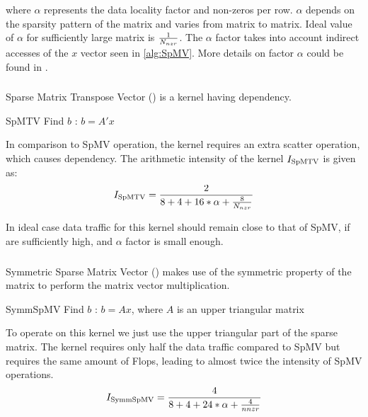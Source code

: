where $\alpha$ represents the data locality factor and \NNZR non-zeros per row. $\alpha$ depends on the sparsity pattern of the matrix and varies from matrix to matrix. Ideal value of $\alpha$ for sufficiently large matrix is $\frac{1}{N_{nzr}}$. The $\alpha$ factor takes into account indirect accesses of the $x$ vector seen in \cref{alg:SpMV}. More details on factor $\alpha$ could be found in \cite{Moritz_sell}.

\subsubsection{\SpMTV}
Sparse Matrix Transpose Vector (\SpMTV) is a kernel having \DTWO dependency.
\begin{algorithm}[H]
	\caption{SpMTV Find $b$ : $b=A'x$} 
	\label{alg:SpMTV}
	\begin{algorithmic}[1]
		\ENDFOR
		\ENDFOR
	\end{algorithmic}
\end{algorithm}
In comparison to SpMV operation, the kernel requires an extra scatter operation, which causes dependency. The arithmetic intensity of the kernel $I_\mathrm{SpMTV}$ is given as:
\begin{equation}
\label{eq:SpMTV_intensity}
I_\mathrm{\SpMTV} = \frac{2}{8+4+16*\alpha+\frac{8}{\NNZRmath}} \\
\end{equation}

In ideal case data traffic for this kernel should remain close to that of SpMV, if \NNZR are sufficiently high, and $\alpha$ factor is small enough.

\subsubsection{\SymmSpmv}
Symmetric Sparse Matrix Vector (\SymmSpmv) makes use of the symmetric property of the matrix to perform the matrix  vector multiplication.
\begin{algorithm}[H]
	\caption{SymmSpMV Find $b$ : $b=Ax$, where $A$ is an upper triangular matrix} 
	\label{alg:SymmSpMV}
	\begin{algorithmic}[1]
		\ENDFOR
		\ENDFOR
	\end{algorithmic}
\end{algorithm}
To operate on this kernel we just use the upper triangular part of the sparse matrix. The kernel requires only half the data traffic compared to SpMV but requires the same amount of Flops, leading to almost twice the intensity of SpMV operations.
\begin{equation}
\label{eq:SymmSpMV_intensity}
I_\mathrm{\SymmSpmv} = \frac{4}{8+4+24*\alpha+\frac{4}{nnzr}} \\
\end{equation}

